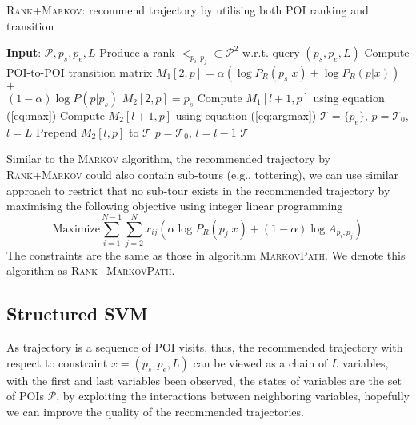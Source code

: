 \begin{algorithm}
\caption{\textsc{Rank+Markov}: recommend trajectory by utilising both POI ranking and transition}
\label{alg:rank+markov}
\begin{algorithmic}[1]
\STATE \textbf{Input}: $\mathcal{P}, p_s, p_e, L$
\STATE Produce a rank $<_{p_i, p_j} \subset \mathcal{P}^2$ w.r.t. query $(p_s, p_e, L)$
\STATE Compute POI-to-POI transition matrix
    \STATE $M_1[2, p] = \alpha ( \log P_R(p_s|x) + \log P_R(p|x) )$ $+$ \\ \hfill $(1-\alpha) \log P(p|p_s)$
    \STATE $M_2[2, p] = p_s$
\ENDFOR
{}
        \STATE Compute $M_1[l+1, p]$ using equation (\ref{eq:max})
        \STATE Compute $M_2[l+1, p]$ using equation (\ref{eq:argmax})
    \ENDFOR
\ENDFOR
\STATE $\mathcal{T}= \{p_e\}$, $p = \mathcal{T}_0$, $l = L$
\REPEAT
    \STATE Prepend $M_2[l, p]$ to $\mathcal{T}$
    \STATE $p = \mathcal{T}_0$, $l = l - 1$
\RETURN $\mathcal{T}$
\end{algorithmic}
\end{algorithm}

Similar to the \textsc{Markov} algorithm,
the recommended trajectory by \textsc{Rank+Markov} could also contain sub-tours (e.g., tottering),
we can use similar approach to restrict that no sub-tour exists in the recommended trajectory
by maximising the following objective using integer linear programming
\begin{displaymath}
    \text{Maximize}  \sum_{i=1}^{N-1} \sum_{j=2}^N x_{ij} (\alpha \log P_R(p_j | x) + (1-\alpha) \log A_{p_i, p_j})
\end{displaymath}
The constraints are the same as those in algorithm \textsc{MarkovPath}.
We denote this algorithm as \textsc{Rank+MarkovPath}.

\subsection{Structured SVM}
\label{sec:ssvm}
As trajectory is a sequence of POI visits,
thus, the recommended trajectory with respect to constraint $x = (p_s, p_e, L)$
can be viewed as a chain of $L$ variables,
with the first and last variables been observed, the states of variables are the set of POIs $\mathcal{P}$,
by exploiting the interactions between neighboring variables,
hopefully we can improve the quality of the recommended trajectories.

